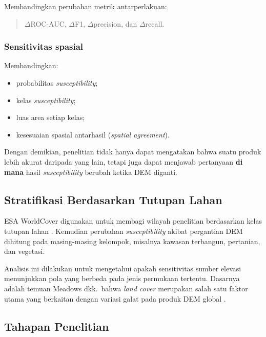 \documentclass[12pt]{article}
\begin{document}
Membandingkan perubahan metrik antarperlakuan:

\begin{quote}
$\Delta$ROC-AUC, $\Delta$F1, $\Delta$precision, dan $\Delta$recall.
\end{quote}

\subsubsection{Sensitivitas spasial}

Membandingkan:

\begin{itemize}
\item probabilitas \textit{susceptibility};
\item kelas \textit{susceptibility};
\item luas area setiap kelas;
\item kesesuaian spasial antarhasil (\textit{spatial agreement}).
\end{itemize}

Dengan demikian, penelitian tidak hanya dapat mengatakan bahwa suatu produk
lebih akurat daripada yang lain, tetapi juga dapat menjawab pertanyaan
\textbf{di mana} hasil \textit{susceptibility} berubah ketika DEM diganti.

\subsection{Stratifikasi Berdasarkan Tutupan Lahan}

ESA WorldCover digunakan untuk membagi wilayah penelitian berdasarkan kelas
tutupan lahan \cite{zanaga2021}. Kemudian perubahan \textit{susceptibility}
akibat pergantian DEM dihitung pada masing-masing kelompok, misalnya
kawasan terbangun, pertanian, dan vegetasi.

Analisis ini dilakukan untuk mengetahui apakah sensitivitas sumber elevasi
menunjukkan pola yang berbeda pada jenis permukaan tertentu. Dasarnya adalah
temuan Meadows dkk.\ bahwa \textit{land cover} merupakan salah satu faktor
utama yang berkaitan dengan variasi galat pada produk DEM global
\cite{meadows2024}.

\subsection{Tahapan Penelitian}
\end{document}
